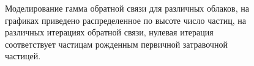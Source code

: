 \begin{figure}[ph!]
    \begin{center}
        \begin{minipage}[h]{0.49\linewidth}
        \end{minipage}
        \hfill
        \begin{minipage}[h]{0.49\linewidth}
        \end{minipage}
        \vfill
        \begin{minipage}[h]{0.49\linewidth}
        \end{minipage}
        \hfill
        \begin{minipage}[h]{0.49\linewidth}
        \end{minipage}
        \vfill
        \begin{minipage}[h]{0.49\linewidth}
        \end{minipage}
        \caption{Моделирование гамма обратной связи для различных облаков, на графиках приведено распределенное по высоте число частиц, на различных итерациях обратной связи, нулевая итерация соответствует частицам рожденным первичной затравочной частицей.}
    \end{center}
    \label{fig:storm:vertical_gamma}
\end{figure}
